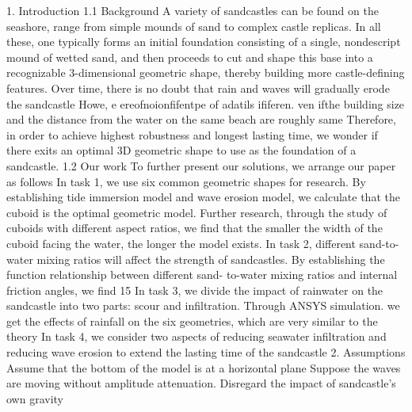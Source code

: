 1. Introduction
1.1 Background
A variety of sandcastles can be found on the seashore, range from simple mounds
of sand to complex castle replicas. In all these, one typically forms an initial foundation
consisting of a single, nondescript mound of wetted sand, and then proceeds to cut and
shape this base into a recognizable 3-dimensional geometric shape, thereby building
more castle-defining features.
Over time, there is no doubt that rain and waves will gradually erode the sandcastle
Howe, e ereofnoionfifentpe of adatils ififeren. ven ifthe
building size and the distance from the water on the same beach are roughly same
Therefore, in order to achieve highest robustness and longest lasting time, we
wonder if there exits an optimal 3D geometric shape to use as the foundation of a
sandcastle.
1.2 Our work
To further present our solutions, we arrange our paper as follows
In task 1, we use six common geometric shapes for research. By establishing
tide immersion model and wave erosion model, we calculate that the cuboid is
the optimal geometric model. Further research, through the study of cuboids
with different aspect ratios, we find that the smaller the width of the cuboid
facing the water, the longer the model exists.
In task 2, different sand-to-water mixing ratios will affect the strength of
sandcastles. By establishing the function relationship between different sand-
to-water mixing ratios and internal friction angles, we find 15%
In task 3, we divide the impact of rainwater on the sandcastle into two parts:
scour and infiltration. Through ANSYS simulation. we get the effects of
rainfall on the six geometries, which are very similar to the theory
In task 4, we consider two aspects of reducing seawater infiltration and
reducing wave erosion to extend the lasting time of the sandcastle
2. Assumptions
Assume that the bottom of the model is at a horizontal plane
Suppose the waves are moving without amplitude attenuation.
Disregard the impact of sandcastle's own gravity